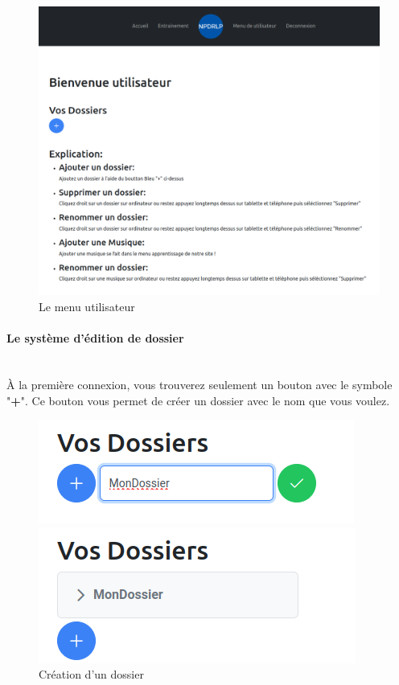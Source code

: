 \documentclass[12pt,french]{article}
\begin{document}
\begin{figure}[H]
	\centering
	\includegraphics[scale=0.21]{menu.png}
	\caption{Le menu utilisateur}
\end{figure}

\paragraph{Le système d'édition de dossier \\\\}

À la première connexion, vous trouverez seulement un bouton avec le symbole "\textbf{+}". Ce bouton vous permet de créer un dossier avec le nom que vous voulez.

\begin{figure}[H]
	\centering
	\begin{minipage}{.5\textwidth}
		\centering
		\includegraphics[scale=0.4]{dossier1.png}
	\end{minipage}%
	\begin{minipage}{.5\textwidth}
		\centering
		\includegraphics[scale=0.4]{dossier2.png}
	\end{minipage}
	\caption{Création d'un dossier}
\end{figure}
\end{document}
